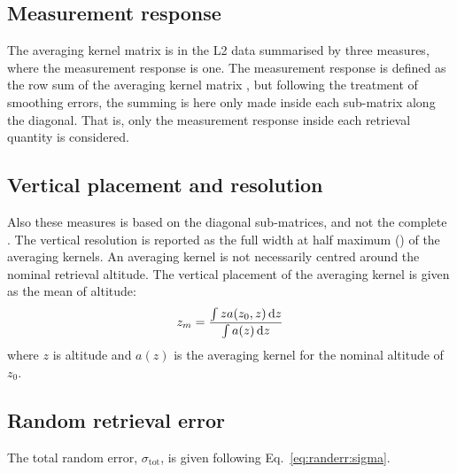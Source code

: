 \subsection{Measurement response}
\label{sec:mresp}
%
The averaging kernel matrix is in the L2 data summarised by three measures,
where the measurement response is one. The measurement response is defined as
the row sum of the averaging kernel matrix \citep{baron:studi:02}, but
following the treatment of smoothing errors, the summing is here only made
inside each sub-matrix along the diagonal. That is, only the measurement
response inside each retrieval quantity is considered.


\subsection{Vertical placement and resolution}
\label{sec:vertres}
%
Also these measures is based on the diagonal sub-matrices, and not the
complete \AvrKrnMtr. The vertical resolution is reported as the full width at
half maximum (\FWHM) of the averaging kernels. An averaging kernel is not
necessarily centred around the nominal retrieval altitude. The vertical
placement of the averaging kernel is given as the mean of altitude:
\begin{equation}
  \label{eq:zmean}
  z_m = \frac{\int z a(z_0,z)\, \mathrm{d} z}{\int a(z)\,\mathrm{d} z}
\end{equation}
where $z$ is altitude and $a(z)$ is the averaging kernel for the nominal
altitude of $z_0$.
\\


\subsection{Random retrieval error}
\label{sec:reterr}
%
The total random error, $\sigma_\mathrm{tot}$, is given following
Eq.~\ref{eq:randerr:sigma}.







